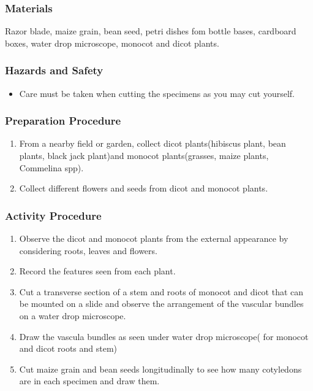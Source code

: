\subsubsection*{Materials}
Razor blade, maize grain, bean seed, petri dishes fom bottle bases, cardboard boxes, water drop microscope, monocot and dicot plants.

\subsubsection*{Hazards and Safety}
\begin{itemize}
\item{Care must be taken when cutting the specimens as you may cut yourself.}
\end{itemize}

\subsubsection*{Preparation Procedure}
\begin{enumerate}
\item{From a nearby field or garden, collect dicot plants(hibiscus plant, bean plants, black jack plant)and monocot plants(grasses, maize plants, Commelina spp).}
\item{Collect different flowers and seeds from dicot and monocot plants.}
\end{enumerate}

\subsubsection*{Activity Procedure}
\begin{enumerate}
\item{Observe the dicot and monocot plants from the external appearance by considering roots, leaves and flowers.}
\item{Record the features seen from each plant.}
\item{Cut a transverse section of a stem and roots of monocot and dicot that can be mounted on a slide and observe the arrangement of the vascular bundles on a water drop microscope.}
\item{Draw the vascula bundles as seen under water drop microscope( for monocot and dicot roots and stem)}
\item{Cut maize grain and bean seeds longitudinally to see how many cotyledons are in each specimen and draw them.}
\end{enumerate}


